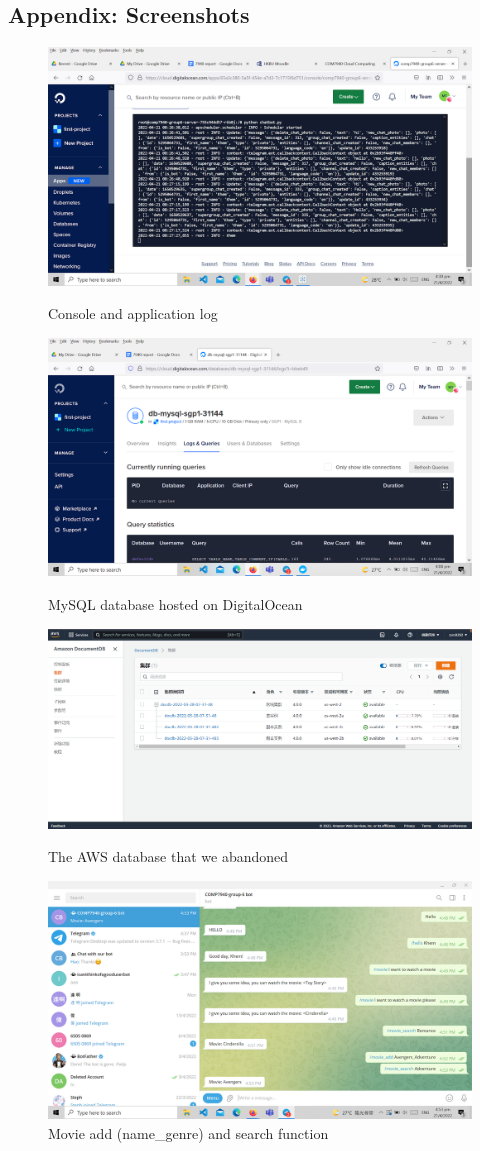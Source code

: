 \documentclass[conference]{IEEEtran}
\begin{document}
\subsection{Appendix: Screenshots}
\begin{figure}[h]
\includegraphics[scale=0.155]{3} 
\caption{Console and application log}
\includegraphics[scale=0.155]{4} 
\caption{MySQL database hosted on DigitalOcean}
\includegraphics[scale=0.155]{7} 
\caption{The AWS database that we abandoned}
\includegraphics[scale=0.155]{9} 
\caption{Movie add (name\_genre) and search function}
\end{figure}
\end{document}
